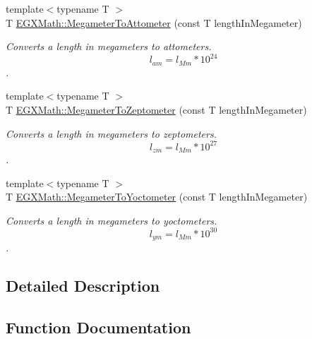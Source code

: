 \begin{DoxyCompactItemize}
{\footnotesize template$<$typename T $>$ }\\T \mbox{\hyperlink{group___e_g_x_math-_conversions-_length_conversions-_s_i-_megameter-_s_i_ga13016f40e740def54199de991815f422}{E\+G\+X\+Math\+::\+Megameter\+To\+Attometer}} (const T length\+In\+Megameter)
\begin{DoxyCompactList}\small\item\em Converts a length in megameters to attometers. \[ l_{am}=l_{Mm} * 10^{24} \]. \end{DoxyCompactList}\item 
{\footnotesize template$<$typename T $>$ }\\T \mbox{\hyperlink{group___e_g_x_math-_conversions-_length_conversions-_s_i-_megameter-_s_i_ga38fee336ea865f1f7ec6541c2256a8fe}{E\+G\+X\+Math\+::\+Megameter\+To\+Zeptometer}} (const T length\+In\+Megameter)
\begin{DoxyCompactList}\small\item\em Converts a length in megameters to zeptometers. \[ l_{zm}=l_{Mm} * 10^{27} \]. \end{DoxyCompactList}\item 
{\footnotesize template$<$typename T $>$ }\\T \mbox{\hyperlink{group___e_g_x_math-_conversions-_length_conversions-_s_i-_megameter-_s_i_gac9b71989abb5a622818f01c5bdbe7285}{E\+G\+X\+Math\+::\+Megameter\+To\+Yoctometer}} (const T length\+In\+Megameter)
\begin{DoxyCompactList}\small\item\em Converts a length in megameters to yoctometers. \[ l_{ym}=l_{Mm} * 10^{30} \]. \end{DoxyCompactList}\end{DoxyCompactItemize}


\subsection{Detailed Description}


\subsection{Function Documentation}
\mbox{\label{group___e_g_x_math-_conversions-_length_conversions-_s_i-_megameter-_s_i_ga13016f40e740def54199de991815f422}} 
